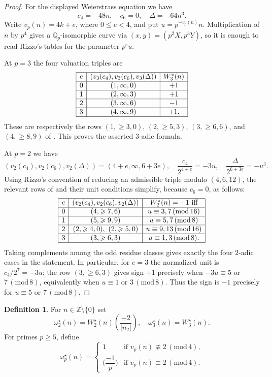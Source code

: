 \documentclass[12pt,reqno]{amsart}
\numberwithin{equation}{section}
\theoremstyle{definition}
\newtheorem{definition}[theorem]{Definition}
\renewcommand{\le}{\leqslant}
\renewcommand{\ge}{\geqslant}
\newcommand{\ZZ}{\mathbb{Z}}
\newcommand{\QQ}{\mathbb{Q}}
\newcommand{\rw}{W}
\renewcommand{\pmod}[1]{\,(\mathrm{mod}\,#1)}
\begin{document}
\begin{proof}
For the displayed Weierstrass equation we have
\[
c_4=-48n,\quad c_6=0,\quad \Delta=-64n^3.
\]
Write $v_p(n)=4k+e$, where $0\le e<4$, and put $u=p^{-v_p(n)}n$.
Multiplication of $n$ by $p^4$ gives a $\QQ_p$-isomorphic curve via $(x,y)=(p^2X,p^3Y)$, so it is enough to read Rizzo's tables for the parameter $p^e u$.

At $p=3$ the four valuation triples are
\[
\begin{array}{|c|c|c|}
\hline
e &(v_3(c_4),v_3(c_6),v_3(\Delta))&\rw_3^\star(n)\\
\hline
0&(1,\infty,0)&+1\\
\hline
1&(2,\infty,3)&+1\\
\hline
2&(3,\infty,6)&-1\\
\hline
3&(4,\infty,9)&+1.\\
\hline
\end{array}
\]
These are respectively the rows $(1,\ge3,0)$, $(2,\ge5,3)$, $(3,\ge6,6)$, and $(4,\ge8,9)$ of \cite[Table~II]{Riz03}.
This proves the asserted $3$-adic formula.

At $p=2$ we have
\[
(v_2(c_4),v_2(c_6),v_2(\Delta))=(4+e,\infty,6+3e),
\quad
\frac{c_4}{2^{4+e}}=-3u,\quad
\frac{\Delta}{2^{6+3e}}=-u^3.
\]
Using Rizzo's convention of reducing an admissible triple modulo $(4,6,12)$, the relevant rows of \cite[Table~III]{Riz03} and their unit conditions simplify, because $c_6=0$, as follows:
\[
\begin{array}{|c|c|c|}
\hline
e&(v_2(c_4),v_2(c_6),v_2(\Delta))&\rw_2^\star(n)=+1\ \text{iff}\\
\hline
0&(4,\ge7,6)&u\equiv3,7\pmod {16}\\
\hline
1&(5,\ge9,9)&u\equiv5,7\pmod 8\\
\hline
2&(2,\ge4,0),\ (2,\ge5,0)&u\equiv9,13\pmod {16}\\
\hline
3&(3,\ge6,3)&u\equiv1,3\pmod 8.\\
\hline
\end{array}
\]
Taking complements among the odd residue classes gives exactly the four $2$-adic cases in the statement.
In particular, for $e=3$ the normalized unit is $c_4/2^7=-3u$; the row $(3,\ge6,3)$ gives sign $+1$ precisely when $-3u\equiv5$ or $7\pmod8$, equivalently when $u\equiv1$ or $3\pmod8$.
Thus the sign is $-1$ precisely for $u\equiv5$ or $7\pmod8$.
\end{proof}

\begin{definition}\label{def:omega23-1728}
For $n\in\ZZ\setminus\{0\}$ set
\[
\omega_2^\star(n)=\rw_2^\star(n)\left(\frac{-2}{|n_2|}\right),
\quad
\omega_3^\star(n)=\rw_3^\star(n).
\]
For primes $p\ge 5$, define
\begin{equation}\label{eq:def-omega-p-star}
\omega_p^\star(n)=
\begin{cases}
1 & \text{if } v_p(n)\not\equiv 2 \pmod 4,\\[0.2em]
\Big(\dfrac{-1}{p}\Big) & \text{if } v_p(n)\equiv 2 \pmod 4.
\end{cases}
\end{equation}
\end{definition}
\end{document}
